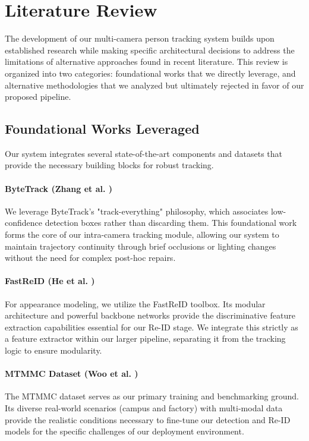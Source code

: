 \section{Literature Review}
\label{section:literature-review}

The development of our multi-camera person tracking system builds upon established research while making specific architectural decisions to address the limitations of alternative approaches found in recent literature. This review is organized into two categories: foundational works that we directly leverage, and alternative methodologies that we analyzed but ultimately rejected in favor of our proposed pipeline.

\subsection{Foundational Works Leveraged}
\label{subsection:leveraged-works}
Our system integrates several state-of-the-art components and datasets that provide the necessary building blocks for robust tracking.

\paragraph{ByteTrack (Zhang et al. \cite{bytetrack})}
We leverage ByteTrack's "track-everything" philosophy, which associates low-confidence detection boxes rather than discarding them. This foundational work forms the core of our intra-camera tracking module, allowing our system to maintain trajectory continuity through brief occlusions or lighting changes without the need for complex post-hoc repairs.

\paragraph{FastReID (He et al. \cite{fastreid})}
For appearance modeling, we utilize the FastReID toolbox. Its modular architecture and powerful backbone networks provide the discriminative feature extraction capabilities essential for our Re-ID stage. We integrate this strictly as a feature extractor within our larger pipeline, separating it from the tracking logic to ensure modularity.

\paragraph{MTMMC Dataset (Woo et al. \cite{mtmmc})}
The MTMMC dataset serves as our primary training and benchmarking ground. Its diverse real-world scenarios (campus and factory) with multi-modal data provide the realistic conditions necessary to fine-tune our detection and Re-ID models for the specific challenges of our deployment environment.

